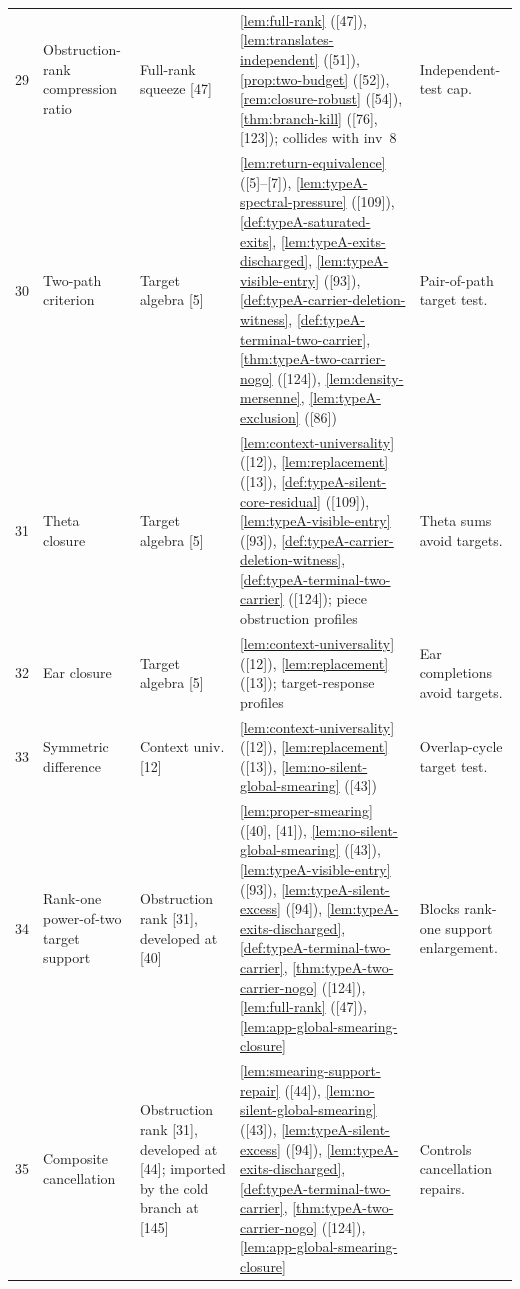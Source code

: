 \documentclass[11pt]{article}
\begin{document}
{\begin{longtable}{C{0.032\textwidth} L{0.145\textwidth} L{0.105\textwidth} L{0.50\textwidth} L{0.155\textwidth}}
29 & Obstruction-rank compression ratio & Full-rank squeeze {[47]} & \cref{lem:full-rank} ([47]), \cref{lem:translates-independent} ([51]), \cref{prop:two-budget} ([52]), \cref{rem:closure-robust} ([54]), \cref{thm:branch-kill} ([76], [123]); collides with inv~8 & Independent-test cap. \\
30 & Two-path criterion & Target algebra {[5]} & \cref{lem:return-equivalence} ([5]--[7]), \cref{lem:typeA-spectral-pressure} ([109]), \cref{def:typeA-saturated-exits}, \cref{lem:typeA-exits-discharged}, \cref{lem:typeA-visible-entry} ([93]), \cref{def:typeA-carrier-deletion-witness}, \cref{def:typeA-terminal-two-carrier}, \cref{thm:typeA-two-carrier-nogo} ([124]), \cref{lem:density-mersenne}, \cref{lem:typeA-exclusion} ([86]) & Pair-of-path target test. \\
31 & Theta closure & Target algebra {[5]} & \cref{lem:context-universality} ([12]), \cref{lem:replacement} ([13]), \cref{def:typeA-silent-core-residual} ([109]), \cref{lem:typeA-visible-entry} ([93]), \cref{def:typeA-carrier-deletion-witness}, \cref{def:typeA-terminal-two-carrier} ([124]); piece obstruction profiles & Theta sums avoid targets. \\
32 & Ear closure & Target algebra {[5]} & \cref{lem:context-universality} ([12]), \cref{lem:replacement} ([13]); target-response profiles & Ear completions avoid targets. \\
33 & Symmetric difference & Context univ. {[12]} & \cref{lem:context-universality} ([12]), \cref{lem:replacement} ([13]), \cref{lem:no-silent-global-smearing} ([43]) & Overlap-cycle target test. \\
34 & Rank-one power-of-two target support & Obstruction rank {[31]}, developed at [40] & \cref{lem:proper-smearing} ([40], [41]), \cref{lem:no-silent-global-smearing} ([43]), \cref{lem:typeA-visible-entry} ([93]), \cref{lem:typeA-silent-excess} ([94]), \cref{lem:typeA-exits-discharged}, \cref{def:typeA-terminal-two-carrier}, \cref{thm:typeA-two-carrier-nogo} ([124]), \cref{lem:full-rank} ([47]), \cref{lem:app-global-smearing-closure} & Blocks rank-one support enlargement. \\
35 & Composite cancellation & Obstruction rank {[31]}, developed at [44]; imported by the cold branch at {[145]} & \cref{lem:smearing-support-repair} ([44]), \cref{lem:no-silent-global-smearing} ([43]), \cref{lem:typeA-silent-excess} ([94]), \cref{lem:typeA-exits-discharged}, \cref{def:typeA-terminal-two-carrier}, \cref{thm:typeA-two-carrier-nogo} ([124]), \cref{lem:app-global-smearing-closure} & Controls cancellation repairs. \\

\end{longtable}}
\end{document}
